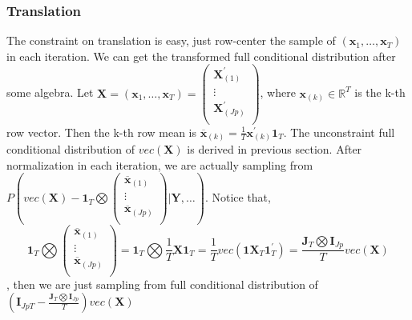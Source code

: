 \documentclass[]{article}
\begin{document}
\subsubsection{Translation}
The constraint on translation is easy, just row-center the sample of \((\mathbf{x}_{1},\ldots,\mathbf{x}_{T})\) in each iteration. We can get the transformed full conditional distribution after some algebra. Let \(\mathbf{X} = \left( \mathbf{x}_{1},\ldots,\mathbf{x}_{T} \right) = \begin{pmatrix}
	\mathbf{X}_{(1)}^{'} \\
	\vdots \\
	\mathbf{X}_{(Jp)}^{'} \\
\end{pmatrix}\), where \(\mathbf{x}_{(k)} \in \mathbb{R}^{T}\) is the k-th row vector.
Then the k-th row mean is
\({\overline{\mathbf{x}}}_{(k)} = \frac{1}{T}\mathbf{x}_{(k)}^{'}\mathbf{1}_{T}\). The unconstraint full conditional distribution of \(vec(\mathbf{X})\) is derived in previous section. After
normalization in each iteration, we are actually sampling from
\(P(vec(\mathbf{X}) - \mathbf{1}_{T}\bigotimes\begin{pmatrix}
	{\overline{\mathbf{x}}}_{(1)} \\
	\vdots \\
	{\overline{\mathbf{x}}}_{(Jp)} \\
\end{pmatrix}|\mathbf{Y},\ldots)\). Notice that,
\[\mathbf{1}_{T}\bigotimes\begin{pmatrix}
	{\overline{\mathbf{x}}}_{(1)} \\
	\vdots \\
	{\overline{\mathbf{x}}}_{(Jp)} \\
\end{pmatrix} = \mathbf{1}_{T}\bigotimes\frac{1}{T}\mathbf{X1}_{T} = \frac{1}{T}vec\left( \mathbf{1X}_{T}\mathbf{1}_{T}^{'} \right) = \frac{\mathbf{J}_{T}\bigotimes \mathbf{I}_{Jp}}{T}vec(\mathbf{X})\]
, then we are just sampling from full conditional distribution of
\((\mathbf{I}_{JpT} - \frac{\mathbf{J}_{T}\bigotimes \mathbf{I}_{Jp}}{T})vec(\mathbf{X})\)
\end{document}
